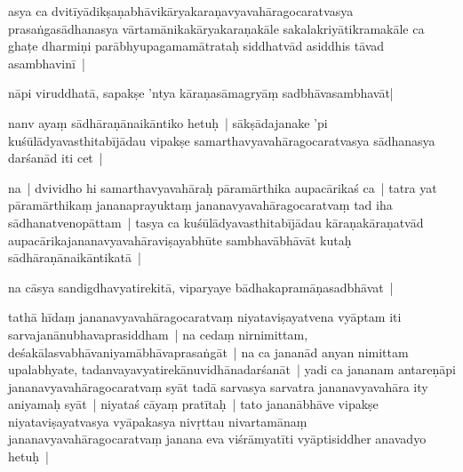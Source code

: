 \documentclass[article,12pt,a4paper]{memoir}%
\newcounter{parCount}
\begin{document}
	  
	  \pstart \leavevmode%
	\label{thakur75-68.20}asya ca dvitīyādikṣaṇabhāvikāryakaraṇavyavahāragocaratvasya prasaṅgasādhanasya vārtamānikakāryakaraṇakāle sakalakriyātikramakāle ca ghaṭe dharmiṇi parābhyupagamamātrataḥ siddhatvād asiddhis tāvad asambhavinī |
	{}
	\pend%
      

	  
	  \pstart \leavevmode%
	\label{thakur75-68.24}nāpi viruddhatā, sapakṣe 'ntya kāraṇasāmagryāṃ sadbhāvasambhavāt| 
	{}
	\pend%
      

	  
	  \pstart \leavevmode%
	\label{thakur75-68.25}nanv ayaṃ sādhāraṇānaikāntiko hetuḥ | sākṣādajanake 'pi kuśūlādyavasthitabījādau vipakṣe samarthavyavahāragocaratvasya sādhanasya darśanād iti cet | 
	{}
	\pend%
      

	  
	  \pstart \leavevmode%
	\label{thakur75-68.26}na | dvividho hi samarthavyavahāraḥ pāramārthika aupacārikaś ca | tatra yat pāramārthikaṃ jananaprayuktaṃ jananavyavahāragocaratvaṃ tad iha sādhanatvenopāttam | tasya ca kuśūlādyavasthitabījādau kāraṇakāraṇatvād aupacārikajananavyavahāraviṣayabhūte sambhavābhāvāt kutaḥ sādhāraṇānaikāntikatā | 
	{}
	\pend%
      

	  
	  \pstart \leavevmode%
	\label{thakur75-69.1}na cāsya sandigdhavyatirekitā, viparyaye bādhakapramāṇasadbhāvat | 
	{}
	\pend%
      

	  
	  \pstart \leavevmode%
	\label{thakur75-69.1a}tathā hīdaṃ jananavyavahāragocaratvaṃ niyataviṣayatvena vyāptam iti sarvajanānubhavaprasiddham | na cedaṃ nirnimittam, deśakālasvabhāvaniyamābhāvaprasaṅgāt | na ca jananād anyan nimittam upalabhyate, tadanvayavyatirekānuvidhānadarśanāt | yadi ca jananam antareṇāpi jananavyavahāragocaratvaṃ syāt tadā sarvasya sarvatra jananavyavahāra ity aniyamaḥ syāt | niyataś cāyaṃ pratītaḥ | tato jananābhāve vipakṣe niyataviṣayatvasya vyāpakasya nivṛttau nivartamānaṃ jananavyavahāragocaratvaṃ janana eva viśrāmyatīti vyāptisiddher anavadyo hetuḥ |
	{}
	\pend%
      
\end{document}
